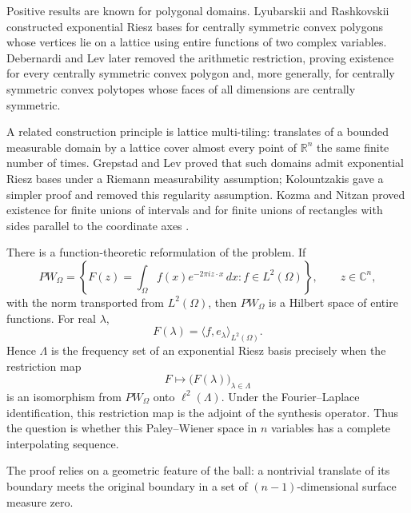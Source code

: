 \documentclass[a4paper,12pt,reqno]{amsart}
\theoremstyle{remark}
\numberwithin{equation}{section}
\newcommand{\R}{\mathbb R}
\newcommand{\C}{\mathbb C}
\begin{document}
Positive results are known for polygonal domains.
Lyubarskii and Rashkovskii \cite{LyubarskiiRashkovskii} constructed
exponential Riesz bases for centrally symmetric convex polygons whose
vertices lie on a lattice
using entire functions of two complex variables.
Debernardi and Lev \cite{DebernardiLev} later removed the arithmetic restriction, proving existence
for every centrally symmetric convex polygon and, more generally, for
centrally symmetric convex polytopes whose faces of all dimensions are
centrally symmetric.

A related construction principle is lattice multi-tiling: translates of a
bounded measurable domain by a lattice cover almost every point of
$\R^n$ the same finite number of times.  Grepstad and Lev \cite{GrepstadLev} proved
that such domains admit exponential Riesz bases under a Riemann
measurability assumption; Kolountzakis \cite{Kolountzakis} gave a simpler
proof and removed this regularity assumption.  Kozma and Nitzan proved
existence for finite unions of intervals \cite{KozmaNitzanIntervals}
and for finite unions of rectangles with sides parallel to the coordinate
axes \cite{KozmaNitzanRectangles}.

There is a function-theoretic reformulation of the problem.  If
\[
 PW_\Omega
 =
 \left\{
 F(z)=\int_\Omega f(x)e^{-2\pi iz\cdot x}\,dx : f\in L^2(\Omega)
 \right\},
 \qquad z\in\C^n,
\]
with the norm transported from $L^2(\Omega)$, then $PW_\Omega$ is a Hilbert space of
entire functions.  For real $\lambda$,
\[
 F(\lambda)=\langle f,e_\lambda\rangle_{L^2(\Omega)}.
\]
Hence $\Lambda$ is the frequency set of an exponential Riesz basis precisely
when the restriction map
\[
 F\longmapsto \bigl(F(\lambda)\bigr)_{\lambda\in\Lambda}
\]
is an isomorphism from $PW_\Omega$ onto $\ell^2(\Lambda)$.  Under the Fourier--Laplace identification, this restriction map is the
adjoint of the synthesis operator. Thus the question is whether this
Paley--Wiener space in $n$ variables has a complete interpolating sequence.

The proof relies on a geometric
feature of the ball: a nontrivial translate of its boundary meets the original
boundary in a set of $(n-1)$-dimensional surface measure zero.
\end{document}
